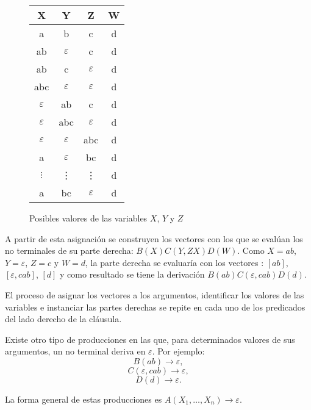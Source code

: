 \documentclass[12pt]{article}
\begin{document}
\begin{figure}
    \centering
    \begin{tabular}{|c|c|c|c|}
        \hline
        X             & Y             & Z             & W \\
        \hline
        a             & b             & c             & d \\
        \hline
        ab            & $\varepsilon$ & c             & d \\
        \hline
        ab            & c             & $\varepsilon$ & d \\
        \hline
        abc           & $\varepsilon$ & $\varepsilon$ & d \\
        \hline
        $\varepsilon$ & ab            & c             & d \\
        \hline
        $\varepsilon$ & abc           & $\varepsilon$ & d \\
        \hline
        $\varepsilon$ & $\varepsilon$ & abc           & d \\
        \hline
        a             & $\varepsilon$ & bc            & d \\
        \hline
        $\vdots$      & \vdots        & \vdots        & d \\
        \hline
        a             & bc            & $\varepsilon$ & d \\
        \hline
    \end{tabular}
    \caption{Posibles valores de las variables $X$, $Y$ y $Z$}
    \label{fig:xyz_eaxmple}
\end{figure}

A partir de esta  asignación se construyen los vectores con los que se evalúan los no terminales 
de su parte derecha: $B(X)C(Y,ZX)D(W)$. Como $X=ab$, $Y=\varepsilon$, $Z=c$ y $W=d$, la parte derecha se evaluaría con los vectores
: $[ab]$, $[\varepsilon, cab]$, $[d]$ y como resultado se tiene la derivación $B(ab)C(\varepsilon,cab)D(d)$.

El proceso de asignar los vectores a los argumentos, identificar los valores de las variables e instanciar las partes derechas se repite en cada uno de los predicados del lado derecho de la cláusula.

Existe otro tipo de producciones en las que, para determinados valores de sus argumentos, un no terminal deriva en $\varepsilon$. Por ejemplo: 
$$B(ab)\to \varepsilon,$$
$$C(\varepsilon,cab)\to \varepsilon,$$
$$D(d)\to \varepsilon.$$

La forma general de estas producciones es $A(X_1,\ldots, X_n)\rightarrow \varepsilon$.
\end{document}
